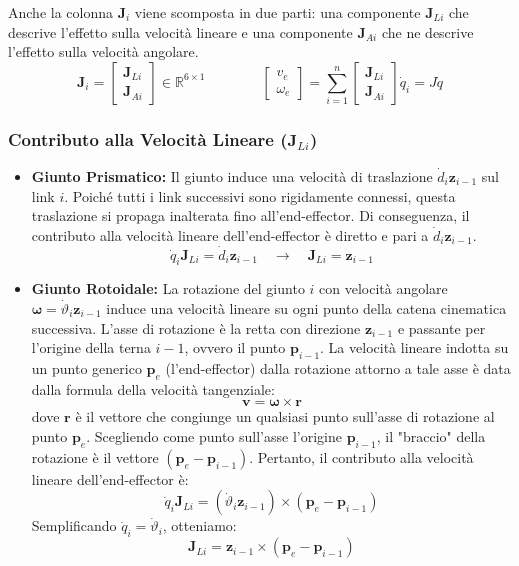 \documentclass[11pt, a4paper]{report}
\begin{document}
Anche la colonna \(\bm{J}_i\) viene scomposta in due parti: una componente \(\bm{J}_{Li}\) che descrive l'effetto sulla velocità lineare e una componente \(\bm{J}_{Ai}\) che ne descrive l'effetto sulla velocità angolare.
\[
    \bm{J}_i = \begin{bmatrix}
        \bm{J}_{Li} \\
        \bm{J}_{Ai}
    \end{bmatrix}
    \in \mathbb{R}^{6 \times 1}
    \qquad\qquad
    \begin{bmatrix}
        v_e \\
        \omega_e
    \end{bmatrix}
    =
    \sum_{i=1}^{n}
    \begin{bmatrix}
        \bm{J}_{Li}\\
        \bm{J}_{Ai}
    \end{bmatrix}
    \dot{q}_i = J \dot{q}
\]

\subsubsection{Contributo alla Velocità Lineare (\texorpdfstring{$\mathbf{J}_{Li}$}{J Li})}
\begin{itemize}
    \item \textbf{Giunto Prismatico:} Il giunto induce una velocità di traslazione \(\dot{d}_i \bm{z}_{i-1}\) sul link \(i\). Poiché tutti i link successivi sono rigidamente connessi, questa traslazione si propaga inalterata fino all'end-effector. Di conseguenza, il contributo alla velocità lineare dell'end-effector è diretto e pari a \(\dot{d}_i \bm{z}_{i-1}\).
    \[
        \dot{q}_i \bm{J}_{Li} = \dot{d}_i \bm{z}_{i-1} \quad \longrightarrow \quad \bm{J}_{Li} = \bm{z}_{i-1}
    \]

    \item \textbf{Giunto Rotoidale:} La rotazione del giunto \(i\) con velocità angolare \(\bm{\omega} = \dot{\vartheta}_i \bm{z}_{i-1}\) induce una velocità lineare su ogni punto della catena cinematica successiva. L'asse di rotazione è la retta con direzione \(\bm{z}_{i-1}\) e passante per l'origine della terna \(i-1\), ovvero il punto \(\bm{p}_{i-1}\).
    La velocità lineare indotta su un punto generico \(\bm{p}_e\) (l'end-effector) dalla rotazione attorno a tale asse è data dalla formula della velocità tangenziale:
    \[
        \bm{v} = \bm{\omega} \times \bm{r}
    \]
    dove \(\bm{r}\) è il vettore che congiunge un qualsiasi punto sull'asse di rotazione al punto \(\bm{p}_e\). Scegliendo come punto sull'asse l'origine \(\bm{p}_{i-1}\), il "braccio" della rotazione è il vettore \((\bm{p}_e - \bm{p}_{i-1})\).
    Pertanto, il contributo alla velocità lineare dell'end-effector è:
    \[
        \dot{q}_i \bm{J}_{Li} = (\dot{\vartheta}_i \bm{z}_{i-1}) \times (\bm{p}_e - \bm{p}_{i-1})
    \]
    Semplificando \(\dot{q}_i = \dot{\vartheta}_i\), otteniamo:
    \[
        \bm{J}_{Li} = \bm{z}_{i-1} \times (\bm{p}_e - \bm{p}_{i-1})
    \]
\end{itemize}
\end{document}
